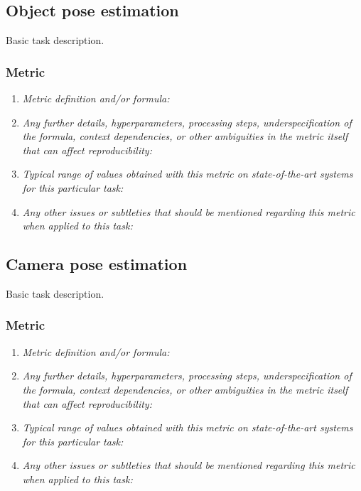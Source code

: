 \documentclass[a4paper,11pt]{article}
\begin{document}
    \subsection{Object pose estimation}
        Basic task description.
        \subsubsection{Metric}
            \begin{enumerate}[label=\alph*.]
                \item \textit{Metric definition and/or formula:}
                \bigskip
                \item \textit{Any further details, hyperparameters, processing steps, underspecification of the formula, context dependencies, or other ambiguities in the metric itself that can affect reproducibility:}
                \bigskip
                \item \textit{Typical range of values obtained with this metric on state-of-the-art systems for this particular task:}
                \bigskip
                \item \textit{Any other issues or subtleties that should be mentioned regarding this metric when applied to this task:}
                \bigskip
            \end{enumerate}

    \subsection{Camera pose estimation}
        Basic task description.
        \subsubsection{Metric}
            \begin{enumerate}[label=\alph*.]
                \item \textit{Metric definition and/or formula:}
                \bigskip
                \item \textit{Any further details, hyperparameters, processing steps, underspecification of the formula, context dependencies, or other ambiguities in the metric itself that can affect reproducibility:}
                \bigskip
                \item \textit{Typical range of values obtained with this metric on state-of-the-art systems for this particular task:}
                \bigskip
                \item \textit{Any other issues or subtleties that should be mentioned regarding this metric when applied to this task:}
                \bigskip
            \end{enumerate}
\end{document}
